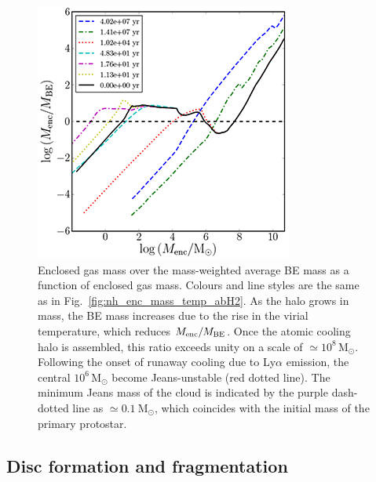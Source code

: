 \documentclass[useAMS,usenatbib]{mnras}
\newcommand{\msun}{\text{M}_\odot}
\newcommand{\mbe}{M_{\rm BE}}
\newcommand{\menc}{M_{\rm enc}}
\begin{document}
\begin{figure}
\begin{center}
\includegraphics[scale=1.0]{./f6.png}
\caption{Enclosed gas mass over the mass-weighted average BE mass as a function of enclosed gas mass. Colours and line styles are the same as in Fig.~\ref{fig:nh_enc_mass_temp_abH2}. As the halo grows in mass, the BE mass increases due to the rise in the virial temperature, which reduces $\menc /\mbe$. Once the atomic cooling halo is assembled, this ratio exceeds unity on a scale of $\simeq 10^8\,\msun$. Following the onset of runaway cooling due to Ly$\alpha$ emission, the central $10^6\,\msun$ become Jeans-unstable (red dotted line). The minimum Jeans mass of the cloud is indicated by the purple dash-dotted line as $\simeq 0.1~\msun$, which coincides with the initial mass of the primary protostar.}
\label{fig:mbe}
\end{center}
\end{figure}

\subsection{Disc formation and fragmentation}
\label{subsec:disc}
\end{document}

